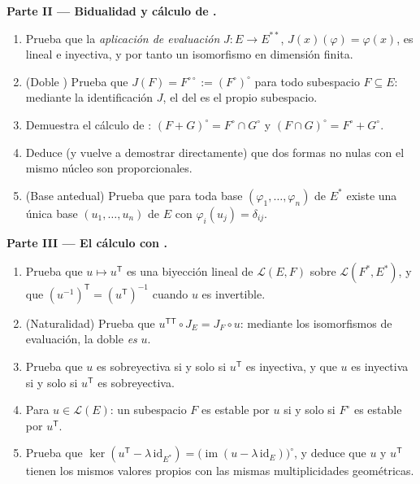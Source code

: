 \begin{problem}
\medskip
\noindent\textbf{Parte II --- Bidualidad y cálculo de
.}
\begin{enumerate}[resume]
  \item Prueba que la \emph{aplicación de evaluación} $J \colon E
        \to E^{**}$, $J(x)(\varphi) = \varphi(x)$, es lineal e
        inyectiva, y por tanto un isomorfismo en dimensión finita.
  \item (Doble ) Prueba que $J(F) = F^{\circ\circ} :=
        (F^\circ)^\circ$ para todo subespacio $F \subseteq E$:
        mediante la identificación $J$, el  del 
        es el propio subespacio.
  \item Demuestra el cálculo de : $(F + G)^\circ =
        F^\circ \cap G^\circ$ y $(F \cap G)^\circ = F^\circ +
        G^\circ$.
  \item Deduce (y vuelve a demostrar directamente) que dos formas
        no nulas con el mismo núcleo son proporcionales.
  \item (Base antedual) Prueba que para toda base $(\varphi_1,
        \dots, \varphi_n)$ de $E^*$ existe una única base $(u_1,
        \dots, u_n)$ de $E$ con $\varphi_i(u_j) = \delta_{ij}$.
\end{enumerate}

\medskip
\noindent\textbf{Parte III --- El cálculo con .}
\begin{enumerate}[resume]
  \item Prueba que $u \mapsto u^{\mathsf T}$ es una biyección
        lineal de $\mathcal{L}(E, F)$ sobre $\mathcal{L}(F^*,
        E^*)$, y que $(u^{-1})^{\mathsf T} = (u^{\mathsf T})^{-1}$
        cuando $u$ es invertible.
  \item (Naturalidad) Prueba que $u^{\mathsf T\mathsf T} \circ J_E
        = J_F \circ u$: mediante los isomorfismos de evaluación, la
        doble  \emph{es} $u$.
  \item Prueba que $u$ es sobreyectiva si y solo si $u^{\mathsf T}$
        es inyectiva, y que $u$ es inyectiva si y solo si
        $u^{\mathsf T}$ es sobreyectiva.
  \item Para $u \in \mathcal{L}(E)$: un subespacio $F$ es estable
        por $u$ si y solo si $F^\circ$ es estable por $u^{\mathsf
        T}$.
  \item Prueba que $\ker(u^{\mathsf T} - \lambda\,
        \mathrm{id}_{E^*}) = \bigl(\operatorname{im}(u - \lambda\,
        \mathrm{id}_E)\bigr)^\circ$, y deduce que $u$ y $u^{\mathsf
        T}$ tienen los mismos valores propios con las mismas
        multiplicidades geométricas.
\end{enumerate}


\end{problem}
